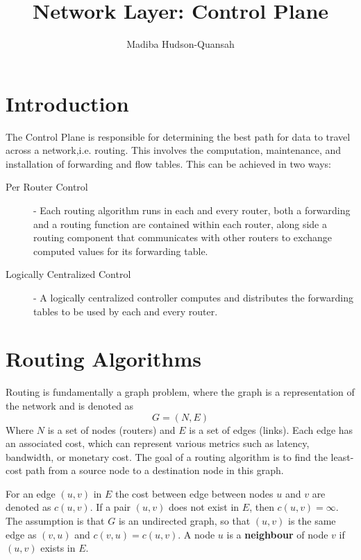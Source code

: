 \documentclass[12pt letter]{report}
\title{\Huge{Network Layer: Control Plane}}
\author{\huge{Madiba Hudson-Quansah}}
\date{}
\begin{document}
\maketitle
\newpage
{}
\tableofcontents
\pagebreak

\chapter{Introduction}

The Control Plane is responsible for determining the best path for
data to travel across a network,i.e. routing. This involves the
computation, maintenance, and installation of forwarding and flow
tables. This can be achieved in two ways:
\begin{description}
  \item[Per Router Control]  - Each routing algorithm runs in each
    and every router, both a forwarding and a routing function are
    contained within each router, along side a routing component that
    communicates with other routers to exchange computed values for
    its forwarding table.
  \item[Logically Centralized Control] - A logically centralized
    controller computes and distributes the forwarding tables to be
    used by each and every router.
\end{description}

\chapter{Routing Algorithms}


Routing is fundamentally a graph problem, where the graph is a
representation of the network and is denoted as
\[
  G = (N, E)
\]
Where $N$ is a set of nodes (routers) and $E$ is a set of edges
(links). Each edge has an associated cost, which can represent
various metrics such as latency, bandwidth, or monetary cost. The
goal of a routing algorithm is to find the least-cost path from a
source node to a destination node in this graph.

For an edge $\left( u, v \right) $ in $E$ the cost between edge
between nodes $u$ and $v$ are denoted as $c \left( u, v \right)$. If
a pair $\left( u, v \right) $ does not exist in $E$, then $c \left(
u, v \right) = \infty$. The assumption is that $G$ is
an undirected graph, so that $\left( u, v \right) $ is the same edge
as $\left( v, u \right) $ and $c \left( v, u \right)  = c \left(u, v
\right)  $. A node $u$ is a \textbf{neighbour} of node $v$ if $\left(
u, v \right) $ exists in $E$.
\end{document}

